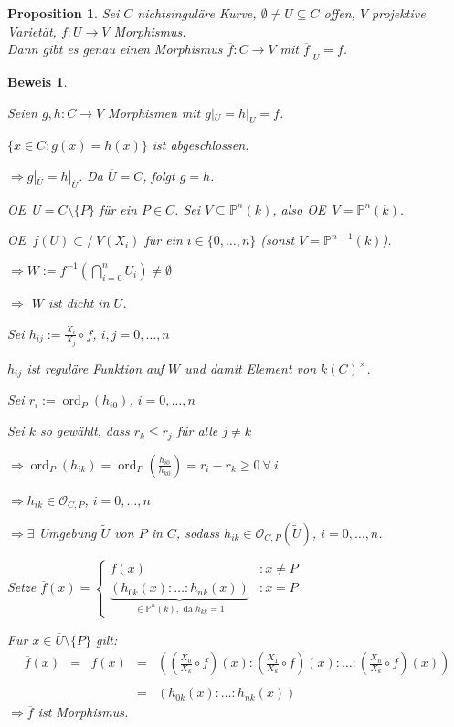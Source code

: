 \documentclass[a4paper, 12pt, numbers=noendperiod, chapterprefix=true, headsepline]{scrbook}
\theoremstyle{break}
\newtheorem{Prop}[Def]{Proposition}
\theoremstyle{nonumberbreak}
\newtheorem{Bew}{Beweis}
\theoremstyle{nonumberplain}
\DeclareMathOperator{\ord}{ord}
\newcommand{\IP}{\mathbb{P}}%
\newcommand{\calO}{\mathcal{O}}
\newcommand{\X}{\times}
\renewcommand{\OE}{O\!\!E~}
\newcommand{\nsubset}{\subset\!\!\!\!\!/~}
\begin{document}
\begin{Prop}\label{20.9}
Sei $C$ nichtsingul\"are Kurve, $\emptyset\ne U\subseteq C$ offen, $V$ projektive Variet\"at, $f:U\to V$ Morphismus.\\
Dann gibt es genau einen Morphismus $\overline{f}:C\to V$ mit $\overline{f}|_U=f$.
\end{Prop}

\begin{Bew}\begin{description}[\setlabelstyle{\itshape}]
\item[Eindeutigkeit:] Seien $g,h:C\to V$ Morphismen mit $g|_U=h|_U=f$.

	$\{x\in C:g(x)=h(x)\}$ ist abgeschlossen.
	
	$\Rightarrow g|_{\overline U}=h|_{\overline U}$. Da $\overline U=C$, folgt $g=h$.
\item[Existenz:] \OE $U=C\setminus\{P\}$ f\"ur ein $P\in C$. Sei $V\subseteq\IP^n(k)$, also \OE $V=\IP^n(k)$.

	\OE $f(U)\nsubset V(X_i)$ f\"ur ein $i\in\{0,\ldots ,n\}$ (sonst $V=\IP^{n-1}(k)$).
	
	$\Rightarrow W:=f^{-1}(\bigcap\limits_{i=0}^n U_i) \ne \emptyset$
	
	$\Rightarrow$ $W$ ist dicht in $U$.
	
	Sei $h_{ij}:=\frac{X_i}{X_j}\circ f$, $i,j=0,\ldots ,n$
	
	$h_{ij}$ ist regul\"are Funktion auf $W$ und damit Element von $k(C)^\X$.
	
	Sei $r_i:=\ord_P(h_{i0})$, $i=0,\ldots ,n$
	
	Sei $k$ so gew\"ahlt, dass $r_k\le r_j$ f\"ur alle $j\ne k$
	
	$\Rightarrow \ord_P(h_{ik}) = \ord_P(\frac{h_{i0}}{h_{k0}}) = r_i-r_k \ge 0 \ \forall \ i$
	
	$\Rightarrow h_{ik}\in \calO_{C,P}$, $i=0,\ldots ,n$
	
	$\Rightarrow \exists$ Umgebung $\widetilde U$ von $P$ in $C$, sodass $h_{ik}\in \calO_{C,P}(\widetilde U)$, $i=0,\ldots ,n$.
	
	Setze $\overline f(x)=\left\{\begin{array}{lr}f(x) & :x\ne P\\ \underbrace{(h_{0k}(x):\ldots:h_{nk}(x))}_{\in\IP^n(k), \text{ da } h_{kk}=1} & :x=P \end{array}\right.$
	
	F\"ur $x\in \overline U\setminus\{P\}$ gilt:
	\[\begin{array}{rrrrl}
	\overline f(x) &=& f(x) &=& \left( \left( \frac{X_0}{X_k}\circ f \right) (x) : \left( \frac{X_1}{X_k}\circ f \right) (x) : \ldots : \left( \frac{X_n}{X_k}\circ f \right) (x) \right)\\
	&&&&\\
	&&&=& (h_{0k}(x):\ldots :h_{nk}(x))\end{array}\]
	$\Rightarrow \overline f$ ist Morphismus.
\end{description}\end{Bew}
\end{document}
